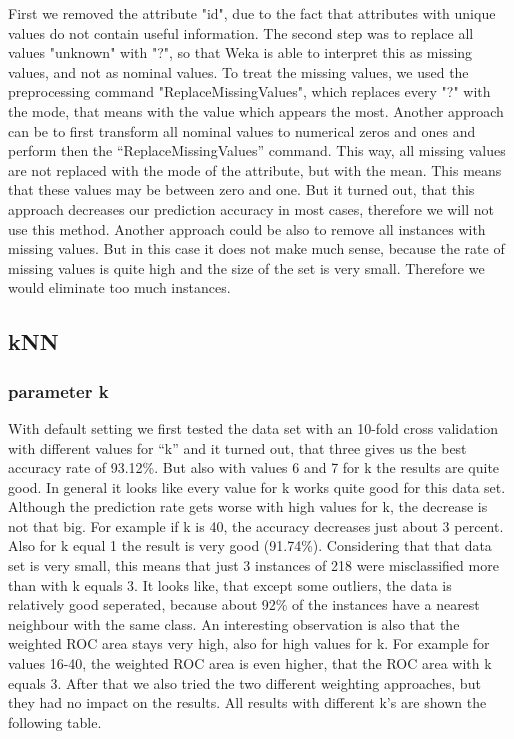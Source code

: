 \documentclass{sig-alternate-05-2015}
\begin{document}
{First we removed the attribute "id", due to the fact that attributes with unique values do not contain useful information. The second step was to replace all values "unknown" with "?", so that Weka is able to interpret this as missing values, and not as nominal values. To treat the missing values, we used the preprocessing command "ReplaceMissingValues", which replaces every "?" with the mode, that means with the value which appears the most.
Another approach can be to first transform all nominal values to numerical zeros and ones and perform then the “ReplaceMissingValues” command. This way, all missing values are not replaced with the mode of the attribute, but with the mean. This means that these values may be between zero and one. But it turned out, that this approach decreases our prediction accuracy in most cases, therefore we will not use this method.
Another approach could be also to remove all instances with missing values. But in this case it does not make much sense, because the rate of missing values is quite high and the size of the set is very small. Therefore we would eliminate too much instances. 
 

\subsection{kNN}
 

\subsubsection{parameter k}
 
With default setting we first tested the data set with an 10-fold cross validation with different values for “k” and it turned out, that three gives us the best accuracy rate of 93.12\%. But also with values 6 and 7 for k the results are quite good. In general it looks like every value for k works quite good for this data set. Although the prediction rate gets worse with high values for k, the decrease is not that big. For example if k is 40, the accuracy decreases just about 3 percent. Also for k equal 1 the result is very good (91.74\%). Considering that that data set is very small, this means that just 3 instances of 218 were misclassified more than with k equals 3. It looks like, that except some outliers, the data is relatively good seperated, because about 92\% of the instances have a nearest neighbour with the same class. An interesting observation is also that the weighted ROC area stays very high, also for high values for k. For example for values 16-40, the weighted ROC area is even higher, that the ROC area with k equals 3. After that we also tried the two different weighting approaches, but they had no impact on the results. All results with different k's are shown the following table.
 
}
\end{document}
